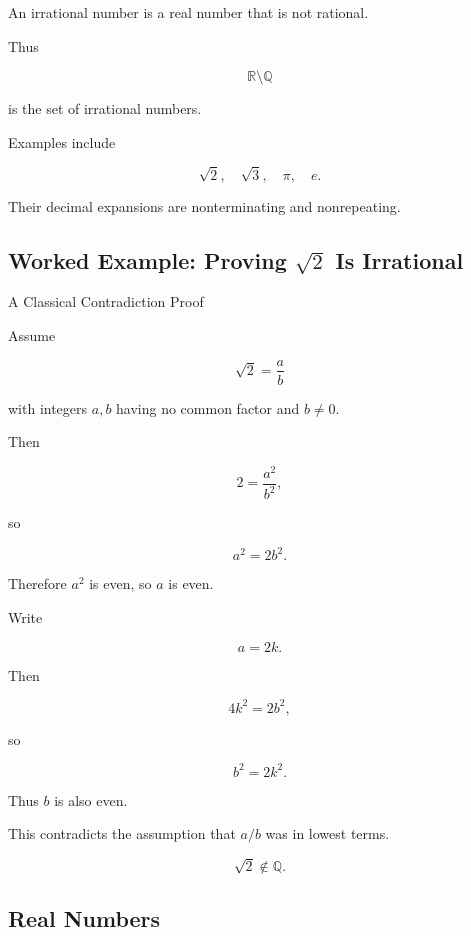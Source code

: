 An irrational number is a real number that is not rational.

Thus

\[
\boxed{
\mathbb{R}\setminus\mathbb{Q}
}
\]

is the set of irrational numbers.

Examples include

\[
\boxed{
\sqrt2,
\quad
\sqrt3,
\quad
\pi,
\quad
e.
}
\]

Their decimal expansions are nonterminating and nonrepeating.

\subsection{Worked Example: Proving \(\sqrt2\) Is Irrational}
\label{subsec:worked-sqrt2-irrational}

\begin{workedexamplebox}{A Classical Contradiction Proof}

Assume

\[
\sqrt2
=
\frac{a}{b}
\]

with integers \(a,b\) having no common factor and \(b\neq0\).

Then

\[
2
=
\frac{a^2}{b^2},
\]

so

\[
a^2
=
2b^2.
\]

Therefore \(a^2\) is even, so \(a\) is even.

Write

\[
a=2k.
\]

Then

\[
4k^2
=
2b^2,
\]

so

\[
b^2
=
2k^2.
\]

Thus \(b\) is also even.

This contradicts the assumption that \(a/b\) was in lowest terms.

\begin{answerbox}
\[
\boxed{
\sqrt2\notin\mathbb{Q}.
}
\]
\end{answerbox}

\end{workedexamplebox}

\subsection{Real Numbers}
\label{subsec:real-numbers-reference}

